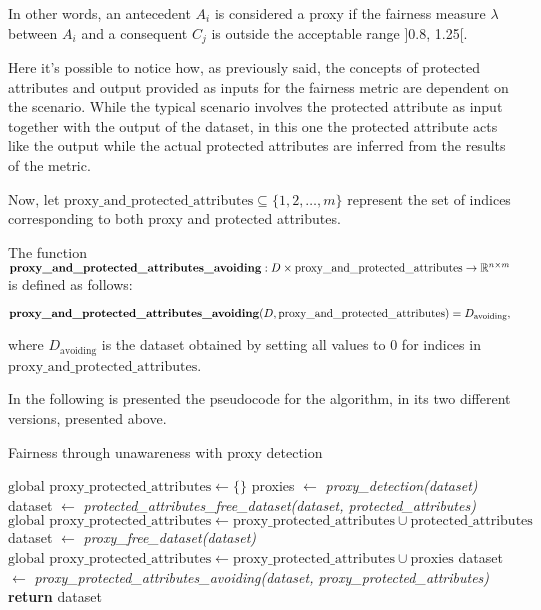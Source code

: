 \documentclass[12pt,a4paper,openright,twoside]{book}
\begin{document}
In other words, an antecedent \( A_i \) is considered a proxy if the fairness measure \( \lambda \) between \( A_i \) and a consequent \( C_j \) is outside the acceptable range ]0.8, 1.25[.

Here it's possible to notice how, as previously said, the concepts of protected attributes and output provided as inputs for the fairness metric are dependent on the scenario. While the typical scenario involves the protected attribute as input together with the output of the dataset, in this one the protected attribute acts like the output while the actual protected attributes are inferred from the results of the metric.

Now, let $\text{proxy\_and\_protected\_attributes} \subseteq \{1, 2, \ldots, m\}$ represent the set of indices corresponding to both proxy and protected attributes.

The function $\text{\textbf{proxy\_and\_protected\_attributes\_avoiding}}: D \times \text{proxy\_and\_protected\_attributes} \rightarrow \mathbb{R}^{n \times m}$ is defined as follows:

\[
\text{\textbf{proxy\_and\_protected\_attributes\_avoiding}}(D, \text{proxy\_and\_protected\_attributes}) = D_{\text{avoiding}},
\]

where $D_{\text{avoiding}}$ is the dataset obtained by setting all values to 0 for indices in $\text{proxy\_and\_protected\_attributes}$.

In the following is presented the pseudocode for the algorithm, in its two different versions, presented above.

\begin{algorithm}[H]
    \caption{Fairness through unawareness with proxy detection}
    \label{alg:fairness_algorithm}
    \begin{algorithmic}[1]
        \State $\text{global } \text{proxy\_protected\_attributes} \gets \{\}$
            \State proxies $\gets$ \textit{proxy\_detection(dataset)}\;
                \State dataset $\gets$ \textit{protected\_attributes\_free\_dataset(dataset, protected\_attributes)}\;
                \State $\text{global } \text{proxy\_protected\_attributes} \gets \text{proxy\_protected\_attributes} \cup \text{protected\_attributes}$ 
            \Else
                \State dataset $\gets$ \textit{proxy\_free\_dataset(dataset)}\;
                \State $\text{global } \text{proxy\_protected\_attributes} \gets \text{proxy\_protected\_attributes} \cup \text{proxies}$
            \EndIf
        \EndWhile
        \State dataset $\gets$ \textit{proxy\_protected\_attributes\_avoiding(dataset, proxy\_protected\_attributes)}
        \State \textbf{return} dataset
    \end{algorithmic}
\end{algorithm}
\end{document}
